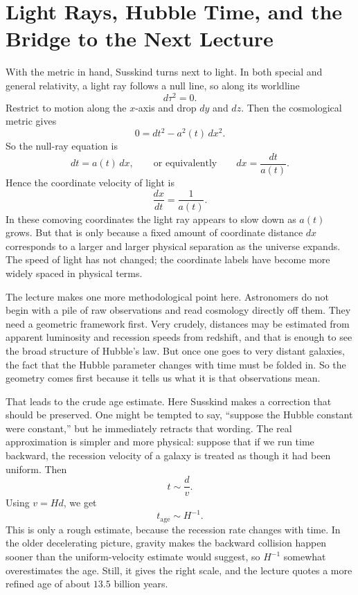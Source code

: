 \section{Light Rays, Hubble Time, and the Bridge to the Next Lecture}

With the metric in hand, Susskind turns next to light. In both special and general relativity, a light ray follows a null line, so along its worldline
\begin{equation}
d\tau^2=0.
\end{equation}
Restrict to motion along the \(x\)-axis and drop \(dy\) and \(dz\). Then the cosmological metric gives
\begin{equation}
0 = dt^2 - a^2(t)\,dx^2.
\end{equation}
So the null-ray equation is
\begin{equation}
dt=a(t)\,dx,
\qquad\text{or equivalently}\qquad
dx=\frac{dt}{a(t)}.
\end{equation}
Hence the coordinate velocity of light is
\begin{equation}
\frac{dx}{dt}=\frac{1}{a(t)}.
\end{equation}
In these comoving coordinates the light ray appears to slow down as \(a(t)\) grows. But that is only because a fixed amount of coordinate distance \(dx\) corresponds to a larger and larger physical separation as the universe expands. The speed of light has not changed; the coordinate labels have become more widely spaced in physical terms.

The lecture makes one more methodological point here. Astronomers do not begin with a pile of raw observations and read cosmology directly off them. They need a geometric framework first. Very crudely, distances may be estimated from apparent luminosity and recession speeds from redshift, and that is enough to see the broad structure of Hubble's law. But once one goes to very distant galaxies, the fact that the Hubble parameter changes with time must be folded in. So the geometry comes first because it tells us what it is that observations mean.

That leads to the crude age estimate. Here Susskind makes a correction that should be preserved. One might be tempted to say, ``suppose the Hubble constant were constant,'' but he immediately retracts that wording. The real approximation is simpler and more physical: suppose that if we run time backward, the recession velocity of a galaxy is treated as though it had been uniform. Then
\begin{equation}
t \sim \frac{d}{v}.
\end{equation}
Using \(v=Hd\), we get
\begin{equation}
t_{\text{age}} \sim H^{-1}.
\end{equation}
This is only a rough estimate, because the recession rate changes with time. In the older decelerating picture, gravity makes the backward collision happen sooner than the uniform-velocity estimate would suggest, so \(H^{-1}\) somewhat overestimates the age. Still, it gives the right scale, and the lecture quotes a more refined age of about \(13.5\) billion years.

